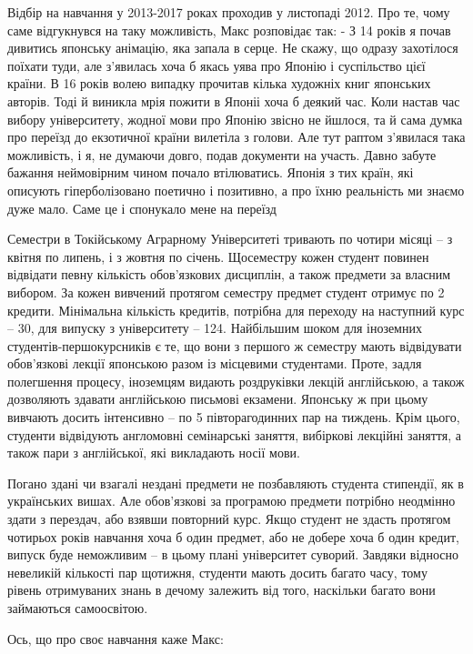 \documentclass[10pt,a4paper]{article}
\begin{document}
\begin{multicols}{3}
Відбір на навчання у 2013-2017 роках проходив у листопаді 2012. Про те, чому саме відгукнувся на таку можливість, Макс розповідає так: - З 14 років я почав дивитись японську анімацію, яка запала в серце. Не скажу, що одразу захотілося поїхати туди, але з'явилась хоча б якась уява про Японію і суспільство цієї країни. В 16 років волею випадку прочитав кілька художніх книг японських авторів. Тоді й виникла мрія пожити в Японіі хоча б деякий час. Коли настав час вибору університету, жодної мови про Японію звісно не йшлося, та й сама думка про переїзд до екзотичної країни вилетіла з голови. Але тут раптом з'явилася така можливість, і я, не думаючи довго, подав документи на участь. Давно забуте бажання неймовірним чином почало втілюватись. Японія з тих країн, які описують гіперболізовано поетично і позитивно, а про їхню реальність ми знаємо дуже мало. Саме це і спонукало мене на переїзд

Семестри в Токійському Аграрному Університеті тривають по чотири місяці – з квітня по липень, і з жовтня по січень. Щосеместру кожен студент повинен відвідати певну кількість обов’язкових дисциплін, а також предмети за власним вибором. За кожен вивчений протягом семестру предмет студент отримує по 2 кредити. Мінімальна кількість кредитів, потрібна для переходу на наступний курс – 30, для випуску з університету – 124. Найбільшим шоком для іноземних студентів-першокурсників є те, що вони з першого ж семестру мають відвідувати обов’язкові лекції японською разом із місцевими студентами. Проте, задля полегшення процесу, іноземцям видають роздруківки лекцій англійською, а також дозволяють здавати англійською письмові екзамени. Японську ж при цьому вивчають досить інтенсивно – по 5 півторагодинних пар на тиждень. Крім цього, студенти відвідують англомовні семінарські заняття, вибіркові лекційні заняття, а також пари з англійської, які викладають носії мови.

Погано здані чи взагалі нездані предмети не позбавляють студента стипендії, як в українських вишах. Але обов’язкові за програмою предмети потрібно неодмінно здати з перездач, або взявши повторний курс. Якщо студент не здасть протягом чотирьох років навчання хоча б один предмет, або не добере хоча б один кредит, випуск буде неможливим – в цьому плані університет суворий. Завдяки відносно невеликій кількості пар щотижня, студенти мають досить багато часу, тому рівень отримуваних знань в дечому залежить від того, наскільки багато вони займаються самоосвітою.

Ось, що про своє навчання каже Макс:


\end{multicols}
\end{document}
